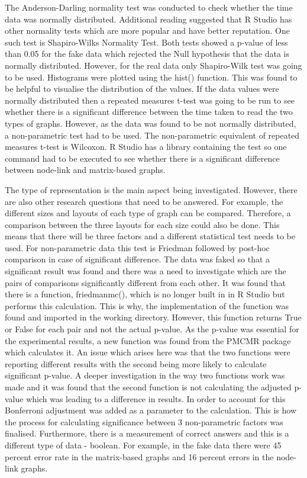 \documentclass{l4proj}
\begin{document}
The Anderson-Darling normality test was conducted to check whether the time data was normally distributed. Additional reading suggested that R Studio has other normality tests which are more popular and have better reputation. One such test is Shapiro-Wilks Normality Test. Both tests showed a p-value of less than 0.05 for the fake data which rejected the Null hypothesis that the data is normally distributed. However, for the real data only Shapiro-Wilk test was going to be used. Histograms were plotted using the hist() function. This was found to be helpful to visualise the distribution of the values. If the data values were normally distributed then a repeated measures t-test was going to be run to see whether there is a significant difference between the time taken to read the two types of graphs. However, as the data was found to be not normally distributed, a non-parametric test had to be used. The non-parametric equivalent of repeated measures t-test is Wilcoxon. R Studio has a library containing the test so one command had to be executed to see whether there is a significant difference between node-link and matrix-based graphs. 

The type of representation is the main aspect being investigated. However, there are also other research questions that need to be answered. For example, the different sizes and layouts of each type of graph can be compared. Therefore, a comparison between the three layouts for each size could also be done. This means that there will be three factors and a different statistical test needs to be used. For non-parametric data this test is Friedman followed by post-hoc comparison in case of significant difference. The data was faked so that a significant result was found and there was a need to investigate which are the pairs of comparisons significantly different from each other. It was found that there is a function, friedmanmc(), which is no longer built in in R Studio but performs this calculation. This is why, the implementation of the function was found and imported in the working directory. However, this function returns True or False for each pair and not the actual p-value. As the p-value was essential for the experimental results, a new function was found from the PMCMR package which calculates it. An issue which arises here was that the two functions were reporting different results with the second being more likely to calculate significant p-value. A deeper investigation in the way two functions work was made and it was found that the second function is not calculating the adjusted p-value which was leading to a difference in results. In order to account for this Bonferroni adjustment was added as a parameter to the calculation. This is how the process for calculating significance between 3  non-parametric factors was finalised. Furthermore, there is a measurement of correct answers and this is a different type of data - boolean. For example, in the fake data there were 45 percent error rate in the matrix-based graphs and 16 percent errors in the node-link graphs. 
\end{document}
